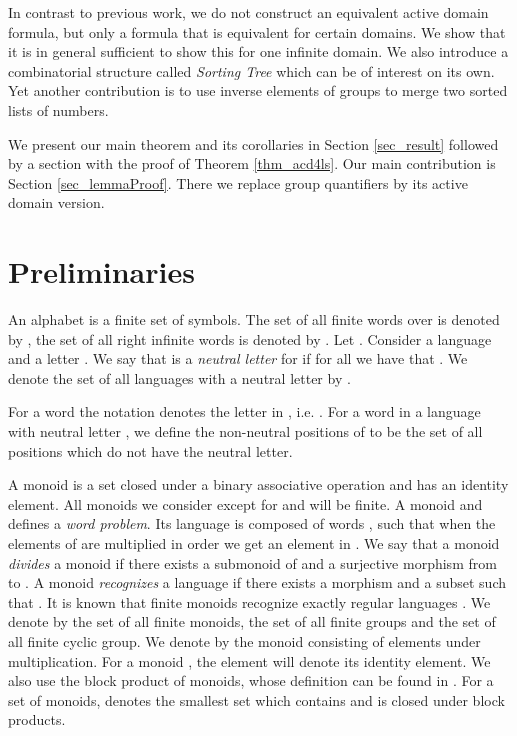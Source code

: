 \documentclass[envcountsame]{llncs}
\begin{document}
In contrast to previous work, we do not construct an equivalent active domain formula, but only a formula that is equivalent for certain domains. We show that it is in general sufficient to show this for one infinite domain. We also introduce a combinatorial structure called \emph{Sorting Tree} which can be of interest on its own. Yet another contribution is to use inverse elements of groups to merge two sorted lists of numbers. 



\noindent We present our main theorem and its corollaries in Section \ref{sec_result} followed by a section with the proof of Theorem
\ref{thm_acd4ls}. Our main contribution is 
Section \ref{sec_lemmaProof}. There we replace group quantifiers by its active domain version. 

\bigskip
\section{Preliminaries} \label{sec_prelims}
An alphabet  is a finite set of symbols. The set of all finite words over  is denoted by , the set of all right infinite words is denoted by . Let .  Consider a language  and a letter . We say that  is a \emph{neutral letter} for  if for all  we have that . We denote the set of all languages with a neutral letter by . 

For a word  
the notation  denotes the  letter in , i.e. .
For a word  in a language  with neutral letter , we define the non-neutral positions  of  to be the set of all positions which do not have the neutral letter. 


A monoid is a set closed under a binary associative operation and has an identity element. All monoids we consider except for  and  will be finite. A monoid  and  defines a \emph{word problem}. Its language is composed of words , such that when the elements of  are multiplied in order we get an element in . 
We say that a monoid  \emph{divides} a monoid  if there exists a submonoid  of  and a surjective morphism from  to
. A monoid  \emph{recognizes} a language  if there exists a morphism  and a subset
 such that . It is known that finite monoids recognize exactly regular languages \cite{str_cirBook}. We
denote by  the set of all finite monoids,  the set of all finite groups and  the set of all
finite cyclic group. We denote by  the monoid consisting of elements  under multiplication. For a monoid , the element
 will denote its identity element. We also use the block product of monoids, whose definition can be found in
\cite{str_cirBook}. For a set  of monoids,  denotes the smallest set which contains  and is closed under block products. 
\end{document}
